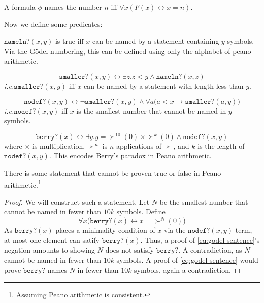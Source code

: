 \documentclass{scrbook}
\renewcommand{\implies}{\to}
\renewcommand{\iff}{\leftrightarrow}
\newcommand{\ie}{\emph{i.e.}\xspace}
\begin{document}
\begin{defn}[names]
  A formula $\phi$ names the number $n$ iff $\forall x (F(x)\iff x=n)$. 
\end{defn}
Now we define some predicates:
\newcommand{\namelen}{\texttt{nameln?}}
\begin{defn}[\namelen]
  $\namelen(x,y)$ is true iff $x$ can be named by a statement containing $y$ symbols. Via the Gödel numbering, this can be defined using only the alphabet of peano arithmetic. 
\end{defn}
\newcommand{\namesmaller}{\texttt{smaller?}}
\begin{defn}[\namesmaller]
  \[
  \namesmaller(x,y)\iff \exists z .z < y \wedge \namelen(x,z)
  \]
  \ie $\namesmaller(x,y)$ iff $x$ can be named by a statement with length less than $y$. 
\end{defn}
\newcommand{\minnodef}{\texttt{nodef?}}
\begin{defn}[\minnodef]
  \[
  \minnodef(x,y)\iff \neg \namesmaller(x,y) \wedge \forall a \bigl(a < x \implies \namesmaller(a,y)\bigr)
  \]
  \ie $\minnodef(x,y)$ iff $x$ is the smallest number that cannot be named in $y$ symbols. 
\end{defn}
\newcommand{\berry}{\texttt{berry?}}
\begin{defn}[\berry]
  \[
  \berry(x) \iff\exists y. y=\succ^{10}(0)\times \succ^{k}(0)\wedge \minnodef(x,y)
  \]
  where $\times$ is multiplication, $\succ^n$ is $n$ applications of $\succ$, and $k$ is the length of $\minnodef(x,y)$.
  This encodes Berry's paradox in Peano arithmetic. 
\end{defn}
\begin{theorem}
  There is some statement that cannot be proven true or false in Peano arithmetic.\footnote{Assuming Peano arithmetic is consistent.}
\end{theorem}
\begin{proof}
  We will construct such a statement. Let $N$ be the smallest number that cannot be named in fewer than $10k$ symbols. Define 
  \begin{equation}
    \label{eq:godel-sentence}
    \forall x \bigl(\berry (x) \iff x= \succ^N(0)\bigr)
  \end{equation}
  As $\berry(x)$ places a minimality condition of $x$ via the $\minnodef(x,y)$ term, at most one element can satify $\berry(x)$. Thus, 
  a proof of \cref{eq:godel-sentence}'s negation amounts to showing $N$ does not satisfy $\berry$. A contradiction, as $N$ cannot be named in fewer than $10k$ symbols. A proof of \cref{eq:godel-sentence} would prove $\berry$ names $N$ in fewer than $10k$ symbols, again a contradiction. 
\end{proof}
\end{document}
